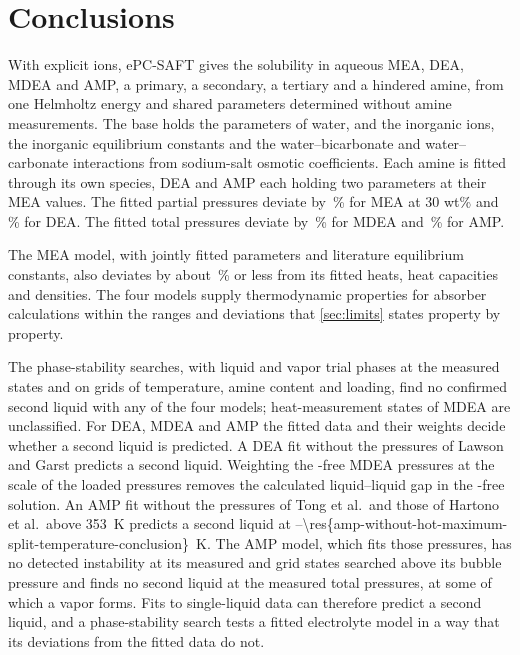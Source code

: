 \section{Conclusions}\label{sec:conclusion}
With explicit ions, ePC-SAFT gives the \COtwo solubility in aqueous MEA, DEA, MDEA and AMP, a primary, a secondary, a tertiary and a hindered amine, from one Helmholtz energy and shared parameters determined without amine measurements.
The base holds the parameters of water, \COtwo and the inorganic ions, the inorganic equilibrium constants and the water--bicarbonate and water--carbonate interactions from sodium-salt osmotic coefficients.
Each amine is fitted through its own species, DEA and AMP each holding two parameters at their MEA values.
The fitted \COtwo partial pressures deviate by \,\% for MEA at 30 wt\% and \,\% for DEA.
The fitted total pressures deviate by \,\% for MDEA and \,\% for AMP.

The MEA model, with  jointly fitted parameters and literature equilibrium constants, also deviates by about \,\% or less from its fitted heats, heat capacities and densities.
The four models supply thermodynamic properties for absorber calculations within the ranges and deviations that \cref{sec:limits} states property by property.

The phase-stability searches, with liquid and vapor trial phases at the measured states and on grids of temperature, amine content and loading, find no confirmed second liquid with any of the four models;  heat-measurement states of MDEA are unclassified.
For DEA, MDEA and AMP the fitted data and their weights decide whether a second liquid is predicted.
A DEA fit without the pressures of Lawson and Garst predicts a second liquid.
Weighting the \COtwo-free MDEA pressures at the scale of the loaded pressures removes the calculated liquid--liquid gap in the \COtwo-free solution.
An AMP fit without the pressures of Tong et al.\ and those of Hartono et al.\ above \SI{353}{\kelvin} predicts a second liquid at --\SI{\res{amp-without-hot-maximum-split-temperature-conclusion}}{\kelvin}.
The AMP model, which fits those pressures, has no detected instability at its measured and grid states searched above its bubble pressure and finds no second liquid at the measured total pressures, at some of which a vapor forms.
Fits to single-liquid data can therefore predict a second liquid, and a phase-stability search tests a fitted electrolyte model in a way that its deviations from the fitted data do not.
